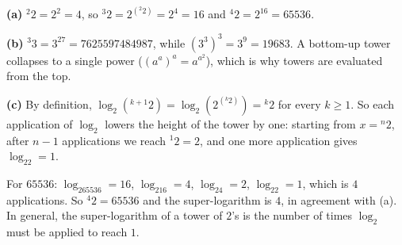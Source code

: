 \textbf{(a)} ${}^{2}2=2^2=4$, so ${}^{3}2=2^{\left({}^{2}2\right)}=2^4=\boxed{16}$ and ${}^{4}2=2^{16}=\boxed{65536}$.

\textbf{(b)} ${}^{3}3=3^{27}=7625597484987$, while $\left(3^3\right)^3=3^9=19683$. A bottom-up tower collapses to a single power ($\left(a^a\right)^a=a^{a^2}$), which is why towers are evaluated from the top.

\textbf{(c)} By definition, $\log_2\left({}^{k+1}2\right)=\log_2\left(2^{\left({}^{k}2\right)}\right)={}^{k}2$ for every $k\ge1$. So each application of $\log_2$ lowers the height of the tower by one: starting from $x={}^{n}2$, after $n-1$ applications we reach ${}^{1}2=2$, and one more application gives $\log_22=1$.

For $65536$: $\log_265536=16$, $\log_216=4$, $\log_24=2$, $\log_22=1$, which is $4$ applications. So ${}^{4}2=65536$ and the super-logarithm is $\boxed{4}$, in agreement with (a). In general, the super-logarithm of a tower of $2$'s is the number of times $\log_2$ must be applied to reach $1$.
